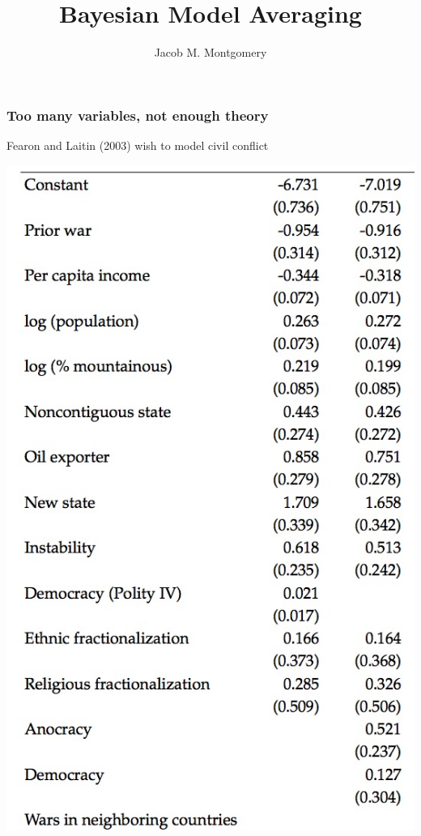 \documentclass[xcolor=dvipsnames]{beamer}
\title[EBMA]{Bayesian Model Averaging}
\author[Montgomery ]{Jacob M. Montgomery \vspace{-.4cm}}
\institute[Wash U.]{\gray Department of Political Science, Washington University in St. Louis}
\date[November 11, 2016]{}
\begin{document}
\frame{\titlepage}


\begin{frame}
\frametitle{Too many variables, not enough theory}

Fearon and Laitin (2003) wish to model civil conflict
\begin{center}
\includegraphics[scale=.18]{model}
\end{center}

\end{frame}
\end{document}
